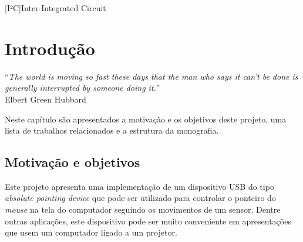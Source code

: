 \documentclass[brazil,pagestart=firstchapter]{abnt}
\begin{document}


\begin{acronym}[EEPROM]

[I²C]{Inter-Integrated Circuit}

\end{acronym}


\tableofcontents


\chapter{Introdução}
\label{cap:introducao}


\vfill{}
\begin{flushright}{}
``\emph{The world is moving so fast these days that the man who says it
can't be done is generally interrupted by someone doing it.}''\\
{\small Elbert Green Hubbard}
\end{flushright}{\small \par}
\vfill{}

Neste capítulo são apresentados a motivação e os objetivos deste projeto, uma
lista de trabalhos relacionados e a estrutura da monografia.
\newpage


\section{Motivação e objetivos}
\label{sec:motivacao}

Este projeto apresenta uma implementação de um dispositivo \acs{USB} do tipo
\textit{absolute pointing device} que pode ser utilizado para controlar o
ponteiro do \textit{mouse} na tela do computador seguindo os movimentos de
um sensor. Dentre outras aplicações, este dispositivo pode ser muito
conveniente em apresentações que usem um computador ligado a um projetor.
\end{document}
